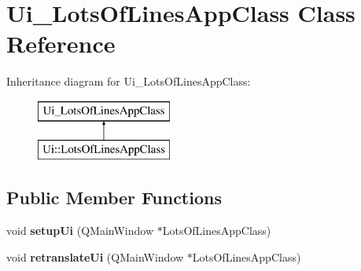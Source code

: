 \hypertarget{class_ui___lots_of_lines_app_class}{}\section{Ui\+\_\+\+Lots\+Of\+Lines\+App\+Class Class Reference}
\label{class_ui___lots_of_lines_app_class}
Inheritance diagram for Ui\+\_\+\+Lots\+Of\+Lines\+App\+Class\+:\begin{figure}[H]
\begin{center}
\leavevmode
\includegraphics[height=2.000000cm]{class_ui___lots_of_lines_app_class}
\end{center}
\end{figure}
\subsection*{Public Member Functions}
\begin{DoxyCompactItemize}
\item 
void {\bfseries setup\+Ui} (Q\+Main\+Window $\ast$Lots\+Of\+Lines\+App\+Class)\hypertarget{class_ui___lots_of_lines_app_class_a0024f8e27a4af589e7748c4a47393657}{}\label{class_ui___lots_of_lines_app_class_a0024f8e27a4af589e7748c4a47393657}

\item 
void {\bfseries retranslate\+Ui} (Q\+Main\+Window $\ast$Lots\+Of\+Lines\+App\+Class)\hypertarget{class_ui___lots_of_lines_app_class_a0f5fa35889eb8640ff4467dba5ba3b07}{}\label{class_ui___lots_of_lines_app_class_a0f5fa35889eb8640ff4467dba5ba3b07}

\end{DoxyCompactItemize}
